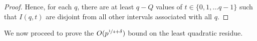 \documentclass{report}
\begin{document}
\begin{proof}
Hence, for each $q$, there are at least $q-Q$ values of $t\in \{0,1,\ldots q-1\}$ such that $I(q,t)$ are disjoint from all other intervals associated with all $q$.

\begin{comment}
For a fixed $q$, $I(q,t)$ are disjoint as $H<p$. Now, for a pair of different values of $q$, say $q_1$ and $q_2$, let $I(q_1,t_1)$ and $I(q_2,t_2)$ intersect. Then we can say:
$$\frac{N+t_1p}{q_1} \leq \frac{N+H+t_2p}{q_2}$$
$$\text{and}\text{ }\frac{N+t_2p}{q_2} \leq \frac{N+H+t_1p}{q_1}$$
$$\Rightarrow N(q_2-q_1)+(t_1q_2-t_2q_1)p\leq Hq_2<\frac{1}{2}p$$
$$\Rightarrow N(q_1-q_2)+(t_2q_1-t_1q_2)p\leq Hq_1<\frac{1}{2}p$$
$$\Rightarrow N(q_2-q_1)-\frac{1}{2}p < (t_2q_1-t_1q_2)p <N(q_2-q_1)+\frac{1}{2}p$$
Since not more than a single multiple of $p$ can occur in a range of size less than $p$, $t_2q_1-t_1q_2$ can take only one value. Because $q_1$ and $q_2$ are co-prime and $0\leq t_1 \leq q_1$ and $0\leq t_2 \leq q_2$, there is only one pair of $t_1$ and $t_2$ values for a unique $t_2q_1-t_1q_2$. This is because for a unique valuation of $t_2q_1-t_1q_2$, the difference in the valuation of the first term must be same as that of the second term for different values of $t_2$. The values of $t_2q_1$ will be multiples of $q_1$, and for the difference in two such values to be the same as two values of $t_1q_2$, a multiple of $q_2$, the least possible difference can be the l.c.m $q_1q_2$, which cannot occur from given range of $t_1$ and $t_2$.

Hence, for each $q$, there are at least $q-Q$ values of $t\in \{0,1,\ldots q-1\}$ such that $I(q,t)$ are disjoint from all other intervals associated with all $q$.
\end{comment}
\end{proof}

We now proceed to prove the $O(p^{\nicefrac{1}{4}+\delta})$ bound on the least quadratic residue.
%
%
\end{document}
